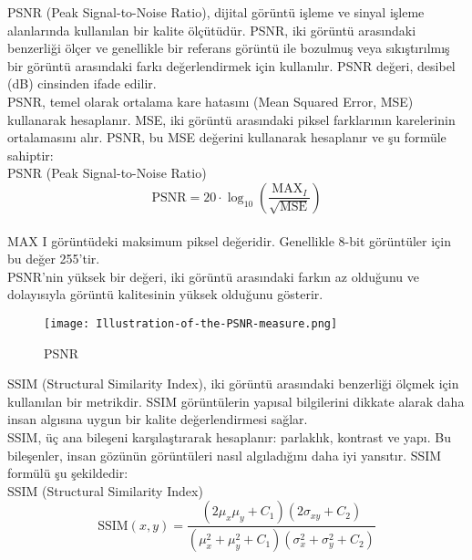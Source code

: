 \documentclass{article}
\begin{document}
\noindent PSNR (Peak Signal-to-Noise Ratio)\cite{Wikipedia3}, dijital görüntü işleme ve sinyal işleme alanlarında kullanılan bir kalite ölçütüdür. PSNR, iki görüntü arasındaki benzerliği ölçer ve genellikle bir referans görüntü ile bozulmuş veya sıkıştırılmış bir görüntü arasındaki farkı değerlendirmek için kullanılır. PSNR değeri, desibel (dB) cinsinden ifade edilir. \\[10pt]

\noindent PSNR, temel olarak ortalama kare hatasını (Mean Squared Error, MSE) kullanarak hesaplanır. MSE, iki görüntü arasındaki piksel farklarının karelerinin ortalamasını alır. PSNR, bu MSE değerini kullanarak hesaplanır ve şu formüle sahiptir: \\[3pt]

PSNR (Peak Signal-to-Noise Ratio)
\begin{equation}
    \text{PSNR} = 20 \cdot \log_{10}\left(\frac{\text{MAX}_I}{\sqrt{\text{MSE}}}\right)
\end{equation} \\[3pt]


\noindent MAX I görüntüdeki maksimum piksel değeridir. Genellikle 8-bit görüntüler için bu değer 255'tir.\\[3pt]

\noindent PSNR'nin yüksek bir değeri, iki görüntü arasındaki farkın az olduğunu ve dolayısıyla görüntü kalitesinin yüksek olduğunu gösterir. \\[3pt]

\renewcommand{\figurename}{Şekil}
\begin{figure}[htbp]
     \centering
\texttt{[image: Illustration-of-the-PSNR-measure.png]}\centering 
  \caption{PSNR\cite{sohag2013novel}}
  \label{fig:resim_etiketi}
\end{figure}


\noindent SSIM (Structural Similarity Index)\cite{Wikipedia4}, iki görüntü arasındaki benzerliği ölçmek için kullanılan bir metrikdir. SSIM görüntülerin yapısal bilgilerini dikkate alarak daha insan algısına uygun bir kalite değerlendirmesi sağlar.\\[3pt]

\noindent SSIM, üç ana bileşeni karşılaştırarak hesaplanır: parlaklık, kontrast ve yapı. Bu bileşenler, insan gözünün görüntüleri nasıl algıladığını daha iyi yansıtır.
SSIM formülü şu şekildedir: \\[3pt]

SSIM (Structural Similarity Index)
\begin{equation}
    \text{SSIM}(x, y) = \frac{(2\mu_x \mu_y + C_1)(2\sigma_{xy} + C_2)}{(\mu_x^2 + \mu_y^2 + C_1)(\sigma_x^2 + \sigma_y^2 + C_2)}
\end{equation} \\[3pt]
\end{document}
